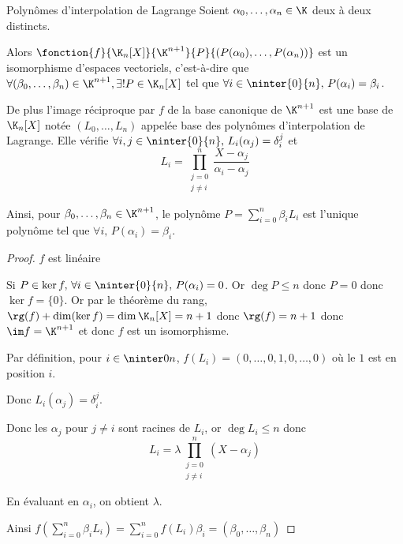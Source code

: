 \begin{proposition}{Polynômes d'interpolation de Lagrange}{}
    Soient $\alpha_0, \dots, \alpha_n \in \K$ deux à deux distincts. 
    
    Alors $\fonction{f}{\K_n[X]}{\K^{n+1}}{P}{\left( P(\alpha_0), \dots, P(\alpha_n) \right)}$
    est un isomorphisme d'espaces vectoriels, c'est-à-dire que 
    $\forall (\beta_0, \dots, \beta_n) \in \K^{n+1}, \exists ! P \in \K_n[X]$ tel que
    $\forall i \in \ninter{0}{n}, \, P(\alpha_i) = \beta_i$.

    De plus l'image réciproque par $f$ de la base canonique de $\K^{n+1}$ est une base de 
    $\K_n[X]$ notée $(L_0, \dots, L_n)$ appelée base des polynômes d'interpolation de Lagrange.
    Elle vérifie $\forall i, j \in \ninter{0}{n}, \, L_i(\alpha_j) = \delta_{i}^{j}$ et
    $$L_i = \prod_{\substack{j=0 \\ j \neq i}}^n \frac{X - \alpha_j}{\alpha_i - \alpha_j}$$

    Ainsi, pour $\beta_0, \dots, \beta_n \in \K^{n + 1}$, le polynôme $P = \sum_{i=0}^n \beta_i L_i$ est
    l'unique polynôme tel que $\forall i, \, P(\alpha_i) = \beta_i$.

\end{proposition}

\begin{proof}
    $f$ est linéaire 

    Si $P \in \ker f, \, \forall i \in \ninter{0}{n}, \, P(\alpha_i) = 0$.
    Or $\deg P \leqslant n$ donc $P = 0 $ donc $\ker f = \{0\}$. 
    Or par le théorème du rang, $\rg(f) + \dim(\ker f) = \dim \K_n[X] = n + 1$ donc
    $\rg(f) = n + 1$ donc $\im f = \K^{n + 1}$ et donc $f$ est un isomorphisme.

    \avspace Par définition, pour $i \in \ninter 0 n$, $f(L_i) = (0, \dots, 0, 1, 0, \dots, 0)$ où le $1$ est en position $i$.

    Donc $L_i(\alpha_j) = \delta_i^j$.

    Donc les $\alpha_j$ pour $j \neq i$ sont racines de $L_i$, or $\deg L_i \leqslant n$ donc
    $$L_i = \lambda \prod_{\substack{j=0 \\ j \neq i}}^n (X - \alpha_j)$$

    En évaluant en $\alpha_i$, on obtient $\lambda$. 

    Ainsi $\displaystyle f \left( \sum_{i = 0 }^{n } \beta_i L_i \right) = \sum_{i = 0 }^{n } f(L_i) \beta_i = (\beta_0, \dots, \beta_n)$
\end{proof}

